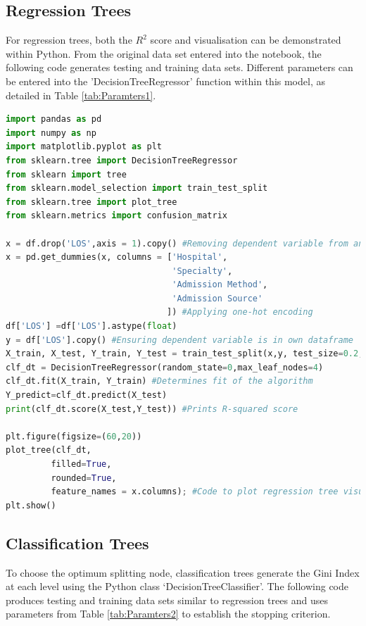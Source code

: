 \documentclass[../thesis.tex]{subfiles}
\begin{document}
\subsection{Regression Trees}\label{sec:pythonreg}
For regression trees, both the $R^{2}$ score and visualisation can be demonstrated within Python. From the original data set entered into the notebook, the following code generates testing and training data sets. Different parameters can be entered into the 'DecisionTreeRegressor' function within this model, as detailed in Table \ref{tab:Paramters1}.
\begin{lstlisting}[language = python]
import pandas as pd
import numpy as np
import matplotlib.pyplot as plt
from sklearn.tree import DecisionTreeRegressor
from sklearn import tree
from sklearn.model_selection import train_test_split
from sklearn.tree import plot_tree
from sklearn.metrics import confusion_matrix

x = df.drop('LOS',axis = 1).copy() #Removing dependent variable from analysis
x = pd.get_dummies(x, columns = ['Hospital',
                                 'Specialty',
                                 'Admission Method',
                                 'Admission Source'
                                ]) #Applying one-hot encoding
df['LOS'] =df['LOS'].astype(float)
y = df['LOS'].copy() #Ensuring dependent variable is in own dataframe
X_train, X_test, Y_train, Y_test = train_test_split(x,y, test_size=0.2, random_state=0) #Creating training and testing data
clf_dt = DecisionTreeRegressor(random_state=0,max_leaf_nodes=4)
clf_dt.fit(X_train, Y_train) #Determines fit of the algorithm
Y_predict=clf_dt.predict(X_test)
print(clf_dt.score(X_test,Y_test)) #Prints R-squared score

plt.figure(figsize=(60,20))
plot_tree(clf_dt,
         filled=True,
         rounded=True,
         feature_names = x.columns); #Code to plot regression tree visual
plt.show()
\end{lstlisting}


\subsection{Classification Trees}\label{sec:pythonclass}
To choose the optimum splitting node, classification trees generate the Gini Index at each level using the Python class `DecisionTreeClassifier'. The following code produces testing and training data sets similar to regression trees and uses parameters from Table \ref{tab:Paramters2} to establish the stopping criterion.
\end{document}
